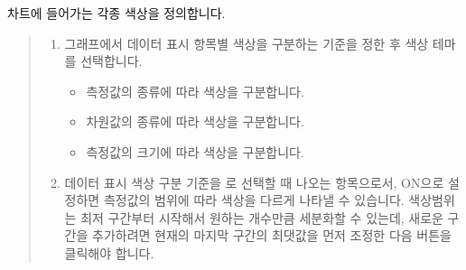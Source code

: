 \documentclass[letterpaper,10pt,english]{sphinxmanual}
\begin{document}
차트에 들어가는 각종 색상을 정의합니다.
\begin{quote}

\begin{figure}[H]
\centering

\noindent{}
\end{figure}
\begin{enumerate}
\def\theenumi{\arabic{enumi}}
\def\labelenumi{\theenumi .}
\makeatletter\def\p@enumii{\p@enumi \theenumi .}\makeatother
\item {} 
 그래프에서 데이터 표시 항목별 색상을 구분하는 기준을 정한 후 색상 테마를 선택합니다.
\begin{itemize}
\item {} 
 측정값의 종류에 따라 색상을 구분합니다.

\item {} 
 차원값의 종류에 따라 색상을 구분합니다.

\item {} 
 측정값의 크기에 따라 색상을 구분합니다.

\end{itemize}

\item {} 
 데이터 표시 색상 구분 기준을 로 선택할 때 나오는 항목으로서, ON으로 설정하면 측정값의 범위에 따라 색상을 다르게 나타낼 수 있습니다. 색상범위는 최저 구간부터 시작해서 원하는 개수만큼 세분화할 수 있는데, 새로운 구간을 추가하려면 현재의 마지막 구간의 최댓값을 먼저 조정한 다음  버튼을 클릭해야 합니다.

\end{enumerate}
\end{quote}

\end{document}
